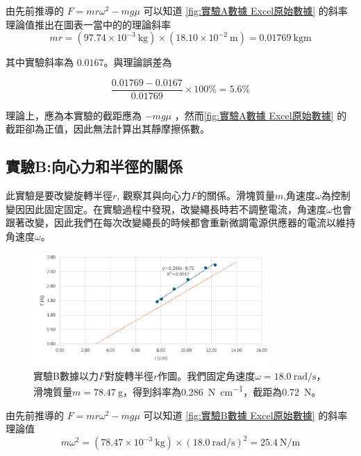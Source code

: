 \documentclass[11pt,a4paper]{article}
\theoremstyle{definition}
\begin{document}
        由先前推導的 $F = mr\omega^2 - m g \mu$ 可以知道 \autoref{fig:實驗A數據 Excel原始數據} 的斜率理論值推出在圖表一當中的的理論斜率
        \begin{equation}
            mr = (97.74 \times 10^{-3}\ \si{\kilogram}) \times (18.10 \times 10^{-2}\ \si{\meter}) = 0.01769\ \si{\kilogram\meter}
        \end{equation}

        其中實驗斜率為 $0.0167$。與理論誤差為

        \begin{equation} 
            \frac{0.01769 - 0.0167}{0.01769} \times 100\% = 5.6\% 
        \end{equation}

        理論上，應為本實驗的截距應為 $-mg\mu$ ，然而\autoref{fig:實驗A數據 Excel原始數據} 的截距卻為正值，因此無法計算出其靜摩擦係數。
    
        \subsection{實驗B:向心力和半徑的關係}
            此實驗是要改變旋轉半徑$r$, 觀察其與向心力$F$的關係。滑塊質量$m$,角速度$\omega$為控制變因因此固定固定。在實驗過程中發現，改變繩長時若不調整電流，角速度$\omega$也會跟著改變，因此我們在每次改變繩長的時候都會重新微調電源供應器的電流以維持角速度$\omega$。

            \begin{figure}[H]
                \centering
                \includegraphics[width=0.8\textwidth]{實驗B數據.png}
                \caption{實驗B數據以力$F$對旋轉半徑$r$作圖。我們固定角速度$\omega = \SI{18.0}{\radian\per\second}$，滑塊質量$m = \SI{78.47}{\gram}$，得到斜率為\SI{0.286}{\newton\per\centi\meter}，截距為\SI{0.72}{\newton}。}
                \label{fig:實驗B數據 Excel原始數據}
            \end{figure}

            由先前推導的 $F = mr\omega^2 - m g \mu$ 可以知道 \autoref{fig:實驗B數據 Excel原始數據} 的斜率理論值
            \begin{equation}
                m\omega^2 = (78.47 \times 10^{-3}\ \si{\kilogram}) \times (18.0\ \si{\radian\per\second})^2 = 25.4\ \si{\newton\per\meter}
            \end{equation}
\end{document}
